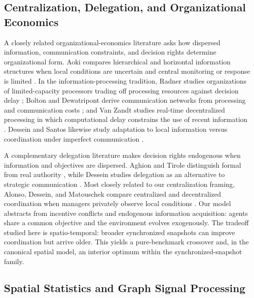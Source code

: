 \documentclass[11pt]{article}
\begin{document}
\subsection{Centralization, Delegation, and Organizational Economics}

A closely related organizational-economics literature asks how dispersed information, communication constraints, and decision rights determine organizational form. Aoki compares hierarchical and horizontal information structures when local conditions are uncertain and central monitoring or response is limited \cite{aoki1986horizontal}. In the information-processing tradition, Radner studies organizations of limited-capacity processors trading off processing resources against decision delay \cite{radner1993organization}; Bolton and Dewatripont derive communication networks from processing and communication costs \cite{bolton1994firm}; and Van Zandt studies real-time decentralized processing in which computational delay constrains the use of recent information \cite{vanzandt1999realtime}. Dessein and Santos likewise study adaptation to local information versus coordination under imperfect communication \cite{dessein2006adaptive}.

A complementary delegation literature makes decision rights endogenous when information and objectives are dispersed. Aghion and Tirole distinguish formal from real authority \cite{aghion1997formal}, while Dessein studies delegation as an alternative to strategic communication \cite{dessein2002authority}. Most closely related to our centralization framing, Alonso, Dessein, and Matouschek compare centralized and decentralized coordination when managers privately observe local conditions \cite{alonso2008coordination}. Our model abstracts from incentive conflicts and endogenous information acquisition: agents share a common objective and the environment evolves exogenously. The tradeoff studied here is spatio-temporal: broader synchronized snapshots can improve coordination but arrive older. This yields a pure-benchmark crossover and, in the canonical spatial model, an interior optimum within the synchronized-snapshot family.

\subsection{Spatial Statistics and Graph Signal Processing}
\label{subsec:related_spatial}
\end{document}
